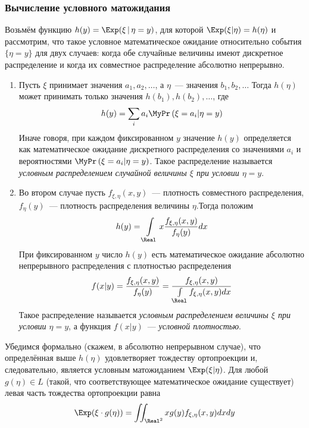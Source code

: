     \subsubsection{Вычисление условного матожидания}
    Возьмём функцию $h(y)=\Exp (\xi \,|\, \eta=y)$, для которой $\Exp (\xi | \eta)=h(\eta)$ и рассмотрим, что такое условное математическое ожидание относительно события $\{\eta=y\}$ для двух случаев: когда обе случайные величины имеют дискретное распределение и когда их совместное распределение абсолютно непрерывно.
    \begin{enumerate}
        \item Пусть $\xi$ принимает значения $a_{1}, a_{2}, \ldots$, а $\eta$~--- значения $b_{1}, b_{2}, \ldots$ Тогда $h(\eta)$ может принимать только значения $h\left(b_{1}\right), h\left(b_{2}\right), \ldots$, где
        \begin{equation*}
            h(y)=\sum\limits_{i} a_{i} \MyPr\left(\xi=a_{i} | \eta=y\right)
        \end{equation*}
        Иначе говоря, при каждом фиксированном $y$ значение $h(y)$ определяется как математическое ожидание дискретного распределения со значениями $a_{i}$ и вероятностями $\MyPr\left(\xi=a_{i} | \eta=y\right)$. Такое распределение называется \textit{условным распределением случайной величины $\xi$ при условии $\eta = y$}.
        
        \item Во втором случае пусть $f_{\xi, \eta}(x, y)$~--- плотность совместного распределения, $f_{\eta}(y)$~--- плотность распределения величины $\eta$.Тогда положим
        \begin{equation*}
            h(y)=\int\limits_{\Real} x \frac{f_{\xi, \eta}(x, y)}{f_{\eta}(y)} d x
        \end{equation*}
        При фиксированном $y$ число $h(y)$ есть математическое ожидание абсолютно непрерывного распределения с плотностью распределения
        \begin{equation*}
            f(x | y)=\frac{f_{\xi, \eta}(x, y)}{f_{\eta}(y)}=\frac{f_{\xi, \eta}(x, y)}{\int\limits_{\Real} f_{\xi, \eta}(x, y) d x}
        \end{equation*}
        Такое распределение называется \textit{условным распределением величины $\xi$ при условии $\eta = y$}, а функция $f(x | y)$~--- \textit{условной плотностью}.
    \end{enumerate}
    

        Убедимся формально (скажем, в абсолютно непрерывном случае), что определённая выше $h(\eta)$ удовлетворяет тождеству ортопроекции и, следовательно, является условным матожиданием $\Exp (\xi | \eta)$. Для любой $g(\eta) \in L$ (такой, что соответствующее математическое ожидание существует) левая часть тождества ортопроекции равна
        \begin{equation*}
            \Exp (\xi \cdot g(\eta))=\iint_{\Real^{2}} x g(y) f_{\xi, \eta}(x, y) d x d y
        \end{equation*}
        

